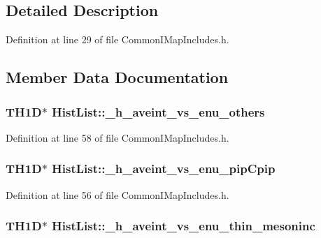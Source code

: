 \subsection{Detailed Description}


Definition at line 29 of file Common\-I\-Map\-Includes.\-h.



\subsection{Member Data Documentation}
\hypertarget{struct_hist_list_ad8a4ad5401b4da1a8726e07b1de596fe}{
\subsubsection[{\-\_\-h\-\_\-aveint\-\_\-vs\-\_\-enu\-\_\-others}]{\setlength{\rightskip}{0pt plus 5cm}T\-H1\-D$\ast$ Hist\-List\-::\-\_\-h\-\_\-aveint\-\_\-vs\-\_\-enu\-\_\-others}}\label{struct_hist_list_ad8a4ad5401b4da1a8726e07b1de596fe}


Definition at line 58 of file Common\-I\-Map\-Includes.\-h.

\hypertarget{struct_hist_list_ae766a15e96658165f0d718bca14e9e2f}{
\subsubsection[{\-\_\-h\-\_\-aveint\-\_\-vs\-\_\-enu\-\_\-pip\-Cpip}]{\setlength{\rightskip}{0pt plus 5cm}T\-H1\-D$\ast$ Hist\-List\-::\-\_\-h\-\_\-aveint\-\_\-vs\-\_\-enu\-\_\-pip\-Cpip}}\label{struct_hist_list_ae766a15e96658165f0d718bca14e9e2f}


Definition at line 56 of file Common\-I\-Map\-Includes.\-h.

\hypertarget{struct_hist_list_ac5d1086e90acca597277d4c14b99e454}{
\subsubsection[{\-\_\-h\-\_\-aveint\-\_\-vs\-\_\-enu\-\_\-thin\-\_\-mesoninc}]{\setlength{\rightskip}{0pt plus 5cm}T\-H1\-D$\ast$ Hist\-List\-::\-\_\-h\-\_\-aveint\-\_\-vs\-\_\-enu\-\_\-thin\-\_\-mesoninc}}\label{struct_hist_list_ac5d1086e90acca597277d4c14b99e454}


